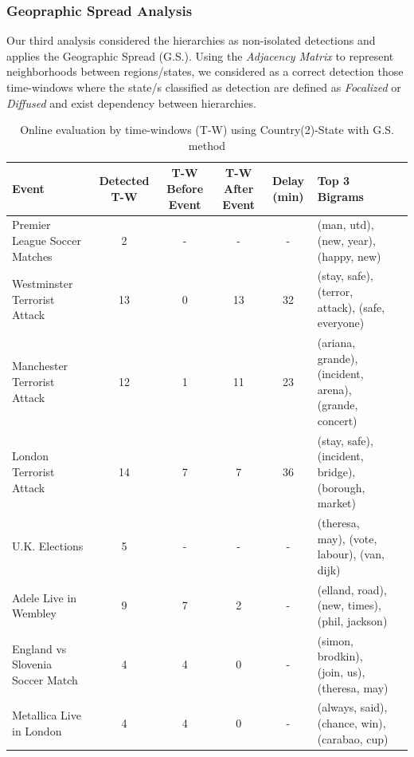 \documentclass[sigconf]{acmart}
\begin{document}
\subsubsection{Geopraphic Spread Analysis}\label{sssec:geospreadanalysis}
Our third analysis considered the hierarchies as non-isolated detections and applies the Geographic Spread (G.S.). Using the \textit{Adjacency Matrix} to represent neighborhoods between regions/states, we considered as a correct detection those time-windows where the state/s classified as detection are defined as \textit{Focalized} or \textit{Diffused} and exist dependency between hierarchies. 

\begin{table}
	\caption{Online evaluation by time-windows (T-W) using Country(2)-State with G.S. method}
	\label{tab:online1}
	\begin{tabular}{lccccp{3.5cm}c}
		\toprule
		Event &Detected T-W & T-W Before Event & T-W After Event & Delay (min) & Top 3 Bigrams\\
		\midrule
		Premier League Soccer Matches & 2& - & - & - & \small{(man, utd), (new, year), (happy, new)} \\
		Westminster Terrorist Attack& 13 & 0 &13 & 32& \small{(stay, safe), (terror, attack), (safe, everyone)}\\
		Manchester Terrorist Attack& 12& 1& 11& 23& \small{(ariana, grande), (incident, arena), (grande, concert)}\\
		London Terrorist Attack & 14 & 7 & 7 & 36 & \small{(stay, safe), (incident, bridge), (borough, market)}\\
		U.K. Elections& 5 & - & - & - & \small{(theresa, may), (vote, labour), (van, dijk)}\\
		Adele Live in Wembley& 9& 7&2&-& \small{(elland, road), (new, times), (phil, jackson)}\\
		England vs Slovenia Soccer Match & 4& 4 & 0 & - & \small{(simon, brodkin), (join, us), (theresa, may)}\\
		Metallica Live in London& 4 & 4 & 0 & - & \small{(always, said), (chance, win), (carabao, cup)}\\
		\bottomrule
	\end{tabular}
\end{table}
\end{document}
